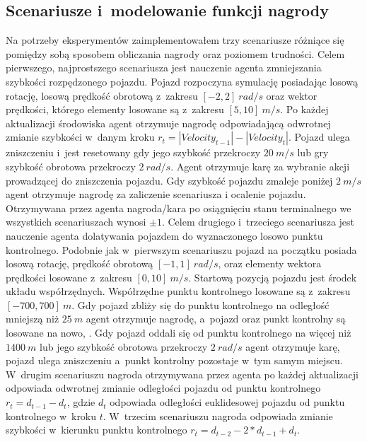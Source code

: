 \documentclass[12pt, oneside]{article}
\begin{document}
\subsection{Scenariusze i~modelowanie funkcji nagrody}
Na potrzeby eksperymentów zaimplementowałem trzy scenariusze różniące się pomiędzy sobą sposobem obliczania nagrody oraz poziomem trudności. 
\newline\newline
Celem pierwszego, najprostszego scenariusza jest nauczenie agenta zmniejszania szybkości rozpędzonego pojazdu. 
Pojazd rozpoczyna symulację posiadając losową rotację, losową prędkość obrotową z~zakresu $[-2,2]~rad/s$ oraz wektor prędkości, którego elementy losowane są z~zakresu $[5,10]~m/s$. 
Po każdej aktualizacji środowiska agent otrzymuje nagrodę odpowiadającą odwrotnej zmianie szybkości w~danym kroku $r_t=|Velocity_{t-1}|-|Velocity_t|$. 
Pojazd ulega zniszczeniu i~jest resetowany gdy jego szybkość przekroczy $20~m/s$ lub gry szybkość obrotowa przekroczy $2~rad/s$. Agent otrzymuje karę za wybranie akcji prowadzącej do zniszczenia pojazdu.
Gdy szybkość pojazdu zmaleje poniżej $2~m/s$ agent otrzymuje nagrodę za zaliczenie scenariusza i ocalenie pojazdu. Otrzymywana przez agenta nagroda/kara po osiągnięciu stanu terminalnego we wszystkich scenariuszach wynosi $\pm1$.
\newline\newline
Celem drugiego i~trzeciego scenariusza jest nauczenie agenta dolatywania pojazdem do wyznaczonego losowo punktu kontrolnego. Podobnie jak w~pierwszym scenariuszu pojazd na początku posiada losową rotację, prędkość obrotową $[-1,1]~rad/s$, oraz elementy wektora prędkości losowane z~zakresu $[0,10]~m/s$.  Startową pozycją pojazdu jest środek układu współrzędnych. Współrzędne punktu kontrolnego losowane są z~zakresu $[-700,700]~m$.
Gdy pojazd zbliży się do punktu kontrolnego na odległość mniejszą niż $25~m$ agent otrzymuje nagrodę, a~pojazd oraz punkt kontrolny są losowane na nowo, .
Gdy pojazd oddali się od punktu kontrolnego na więcej niż $1400~m$ lub jego szybkość obrotowa przekroczy $2~rad/s$ agent otrzymuje karę, pojazd ulega zniszczeniu a~punkt kontrolny pozostaje w~tym samym miejscu. 
W~drugim scenariuszu nagroda otrzymywana przez agenta po każdej aktualizacji odpowiada odwrotnej zmianie odległości pojazdu od punktu kontrolnego $r_t = d_{t-1}-d_t$, gdzie $d_t$ odpowiada odległości euklidesowej pojazdu od punktu kontrolnego w~kroku $t$. 
W~trzecim scenariuszu nagroda odpowiada zmianie szybkości w~kierunku punktu kontrolnego $r_t = d_{t-2} - 2*d_{t-1} + d_t$.
\end{document}
